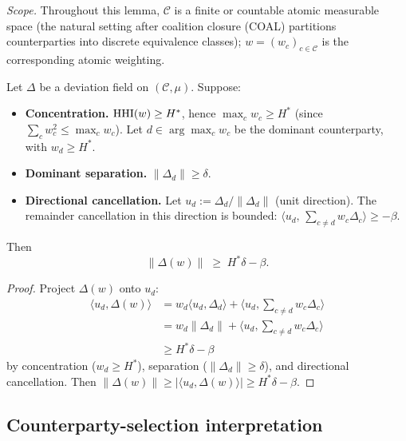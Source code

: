 \begin{lemma}
\label{lem:reverse-companion}
\emph{Scope.} Throughout this lemma, $\mathcal{C}$ is a finite
or countable atomic measurable space (the natural setting after
coalition closure (COAL) partitions counterparties into discrete
equivalence classes); $w = (w_c)_{c \in \mathcal{C}}$ is the
corresponding atomic weighting.

Let $\Delta$ be a deviation field on $(\mathcal{C}, \mu)$.
Suppose:
\begin{itemize}
\item \textbf{Concentration.} $\mathrm{HHI}(w) \geq H^*$, hence
  $\max_c w_c \geq H^*$ (since $\sum_c w_c^2 \leq \max_c w_c$).
  Let $d \in \arg\max_c w_c$ be the dominant counterparty, with
  $w_d \geq H^*$.
\item \textbf{Dominant separation.} $\|\Delta_d\| \geq \delta$.
\item \textbf{Directional cancellation.} Let $u_d :=
  \Delta_d / \|\Delta_d\|$ (unit direction). The remainder
  cancellation in this direction is bounded:
  $\langle u_d, \,\sum_{c \neq d} w_c \Delta_c\rangle \geq -\beta$.
\end{itemize}
Then
\begin{equation}
\label{eq:reverse-bound-companion}
  \|\Delta(w)\| \;\geq\; H^* \delta - \beta.
\end{equation}
\end{lemma}

\begin{proof}
Project $\Delta(w)$ onto $u_d$:
\begin{align*}
  \langle u_d, \Delta(w)\rangle
  &= w_d \langle u_d, \Delta_d\rangle + \langle u_d,
    \sum_{c \neq d} w_c \Delta_c\rangle \\
  &= w_d \|\Delta_d\| + \langle u_d,
    \sum_{c \neq d} w_c \Delta_c\rangle \\
  &\geq H^* \delta - \beta
\end{align*}
by concentration ($w_d \geq H^*$), separation ($\|\Delta_d\|
\geq \delta$), and directional cancellation. Then
$\|\Delta(w)\| \geq |\langle u_d, \Delta(w)\rangle| \geq H^*
\delta - \beta$.
\end{proof}

\subsection{Counterparty-selection interpretation}
\label{sec:concgap-counterparty}

